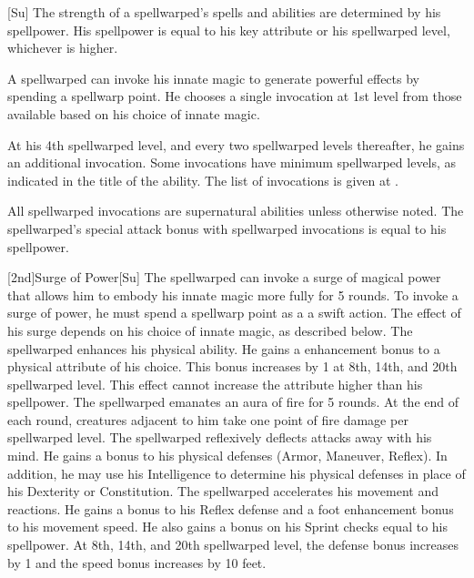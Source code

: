 [Su]
The strength of a spellwarped's spells and abilities are determined by his spellpower.
His spellpower is equal to his key attribute or his spellwarped level, whichever is higher.

A spellwarped can invoke his innate magic to generate powerful effects by spending a spellwarp point.
He chooses a single invocation at 1st level from those available based on his choice of innate magic.

At his 4th spellwarped level, and every two spellwarped levels thereafter, he gains an additional invocation.
Some invocations have minimum spellwarped levels, as indicated in the title of the ability.
The list of invocations is given at .

All spellwarped invocations are supernatural abilities unless otherwise noted.
The spellwarped's special attack bonus with spellwarped invocations is equal to his spellpower.

[2nd]{Surge of Power}[Su]
The spellwarped can invoke a surge of magical power that allows him to embody his innate magic more fully for 5 rounds.
To invoke a surge of power, he must spend a spellwarp point as a a swift action.
The effect of his surge depends on his choice of innate magic, as described below.
The spellwarped enhances his physical ability.
He gains a  enhancement bonus to a physical attribute of his choice.
This bonus increases by 1 at 8th, 14th, and 20th spellwarped level.
This effect cannot increase the attribute higher than his spellpower.
The spellwarped emanates an aura of fire for 5 rounds.
At the end of each round, creatures adjacent to him take one point of fire damage per spellwarped level.
The spellwarped reflexively deflects attacks away with his mind.
He gains a  bonus to his physical defenses (Armor, Maneuver, Reflex).
In addition, he may use his Intelligence to determine his physical defenses in place of his Dexterity or Constitution.
The spellwarped accelerates his movement and reactions.
He gains a  bonus to his Reflex defense and a  foot enhancement bonus to his movement speed.
He also gains a bonus on his Sprint checks equal to his spellpower.
At 8th, 14th, and 20th spellwarped level, the defense bonus increases by 1 and the speed bonus increases by 10 feet.

